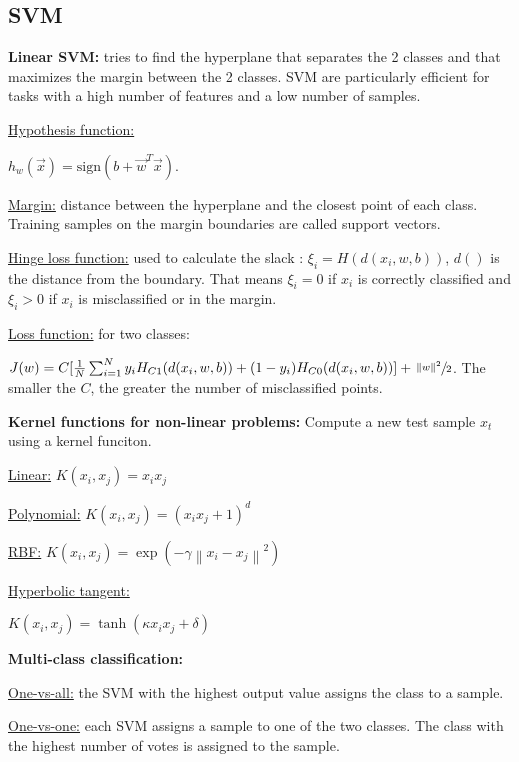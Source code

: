 \subsection*{SVM}
\textbf{Linear SVM:} tries to find the hyperplane that separates the 2
classes and that maximizes the margin between the 2 classes.
SVM are particularly efficient for tasks with a high number of features and a low number of samples.

\underline{Hypothesis function:}

$h_w(\overrightarrow{x})=\text{sign}(b+\overrightarrow{w}^T\overrightarrow{x})$.

\underline{Margin:} distance between the hyperplane and the closest point of each class. Training samples
on the margin boundaries are called support vectors.

\underline{Hinge loss function:} used to calculate the slack :
$\xi_i=H(d(x_i, w, b))$, $d()$ is the distance from the boundary. That means
$\xi_i=0$ if $x_i$ is correctly classified and $\xi_i>0$ if $x_i$ is misclassified or
in the margin.

\underline{Loss function:} for two classes:

$J(w)=C[\frac{1}{N}\sum_{i=1}^{N}y_iH_{C1}(d(x_i, w, b))+(1-y_i)H_{C0}(d(x_i, w, b))]+\sfrac{\left\|w\right\|^2}{2}$.
The smaller the $C$, the greater the number of misclassified points.

\textbf{Kernel functions for non-linear problems:}
Compute a new test sample $x_t$ using a kernel funciton.

\underline{Linear:} $K(x_i, x_j)=x_ix_j$

\underline{Polynomial:} $K(x_i, x_j)=(x_ix_j+1)^d$

\underline{RBF:} $K(x_i, x_j)=\exp(-\gamma\left\|x_i-x_j\right\|^2)$

\underline{Hyperbolic tangent:}

$K(x_i, x_j)=\tanh(\kappa x_ix_j+\delta)$

\textbf{Multi-class classification:}

\underline{One-vs-all:} the SVM with the highest output value assigns the class to a sample.

\underline{One-vs-one:} each SVM assigns a sample to one of the two classes.
The class with the highest number of votes is assigned to the sample.





